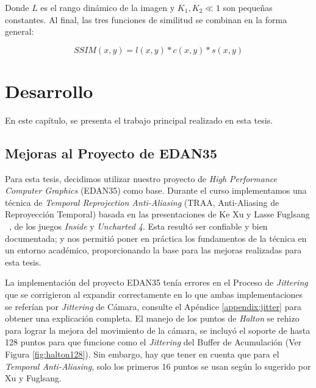 \documentclass[pregrado]{tesis-usb} %
\begin{document}
Donde $L$ es el rango dinámico de la imagen y $K_1, K_2 \ll1$ son pequeñas constantes. Al final, las tres funciones de similitud se combinan en la forma general:

\begin{equation}\label{eq:ssim}
SSIM(x,y)=l(x,y)*c(x,y)*s(x,y)
\end{equation}



\chapter{Desarrollo}
En este capítulo, se presenta el trabajo principal realizado en esta tesis.
\section{Mejoras al Proyecto de EDAN35}
Para esta tesis, decidimos utilizar nuestro proyecto de \textit{High Performance Computer Graphics} (EDAN35) como base. Durante el curso implementamos una técnica de \textit{Temporal Reprojection Anti-Aliasing} (TRAA, Anti-Aliasing de Reproyección Temporal) basada en las presentaciones de Ke Xu y Lasse Fuglsang ~\cite{XU2016, Fuglsand2016}, de los juegos \textit{Inside} y \textit{Uncharted 4}. Esta resultó ser confiable y bien documentada; y nos permitió poner en práctica los fundamentos de la técnica en un entorno académico, proporcionando la base para las mejoras realizadas para esta tesis.

La implementación del proyecto EDAN35 tenía errores en el Proceso de \textit{Jittering} que se corrigieron al expandir correctamente en lo que ambas implementaciones se referían por \textit{Jittering} de Cámara, consulte el Apéndice \ref{appendix:jitter} para obtener una explicación completa. El manejo de los puntos de \textit{Halton} se rehizo para lograr la mejora del movimiento de la cámara, se incluyó el soporte de hasta 128 puntos para que funcione como el \textit{Jittering} del Buffer de Acumulación (Ver Figura \ref{fig:halton128}). Sin embargo, hay que tener en cuenta que para el \textit{Temporal Anti-Aliasing}, solo los primeros 16 puntos se usan según lo sugerido por Xu y Fuglsang. ~\cite{XU2016, Fuglsand2016}
\end{document}
